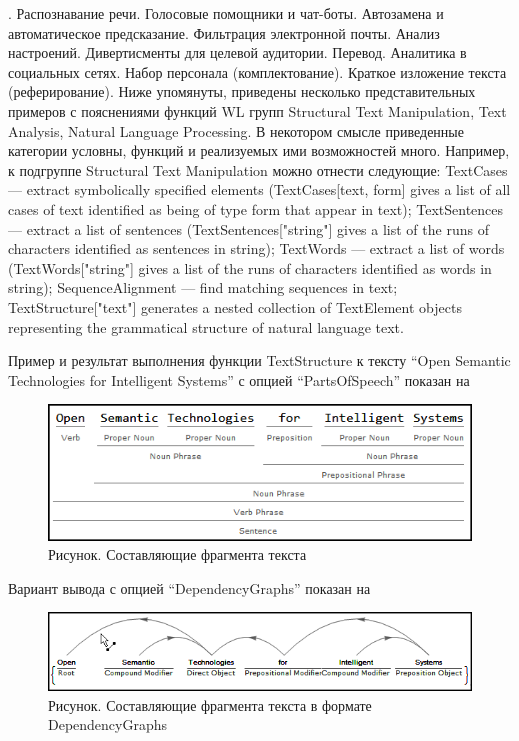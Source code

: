 .
Распознавание речи. Голосовые помощники и чат-боты. Автозамена и автоматическое предсказание. Фильтрация электронной почты. Анализ настроений. Дивертисменты для целевой аудитории. Перевод. Аналитика в социальных сетях. Набор персонала (комплектование). Краткое изложение текста (реферирование). 
Ниже упомянуты, приведены несколько представительных примеров с пояснениями функций WL групп Structural Text Manipulation, Text Analysis, Natural Language Processing. 
В некотором смысле приведенные категории условны, функций и реализуемых ими возможностей много. Например, к подгруппе Structural Text Manipulation можно отнести следующие: 
TextCases --- extract symbolically specified elements (TextCases[text, form] gives a list of all cases of text identified as being of type form that appear in text); TextSentences --- extract a list of sentences (TextSentences["string"] gives a list of the runs of characters identified as sentences in string); TextWords --- extract a list of words (TextWords["string"] gives a list of the runs of characters identified as words in string); SequenceAlignment --- find matching sequences in text; TextStructure["text"] generates a nested collection of TextElement objects representing the grammatical structure of natural language text.

Пример и результат выполнения функции TextStructure к тексту ``Open Semantic Technologies for Intelligent Systems'' с опцией ``PartsOfSpeech'' показан на \textit{}
\begin{figure}[H]
	\centering
	\includegraphics[scale=0.8]{images/part7/chapter_integration/integr_alg4.png}
	\caption{Рисунок. Составляющие фрагмента текста}
	\label{fig:integr_alg4}
\end{figure}

Вариант вывода с опцией ``DependencyGraphs'' показан на \textit{}
\begin{figure}[H]
	\centering
	\includegraphics[scale=0.71]{images/part7/chapter_integration/integr_alg5.png}
	\caption{Рисунок. Составляющие фрагмента текста в формате DependencyGraphs}
	\label{fig:integr_alg5}
\end{figure}

